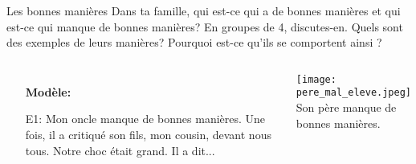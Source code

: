 \begin{frame}{Les bonnes manières}
  Dans ta famille, qui est-ce qui a de bonnes manières et qui est-ce qui manque de bonnes manières?
  En groupes de 4, discutes-en.
  Quels sont des exemples de leurs manières?
  Pourquoi est-ce qu'ils se comportent ainsi ?
  \begin{columns}
      \begin{itemize}
        \item[] \textbf{Modèle:}
        \item[E1:] \alert{Mon} oncle manque de bonnes manières. Une fois, il a critiqué \alert{son} fils, \alert{mon} cousin, devant nous tous. \alert{Notre} choc était grand. Il a dit...
      \end{itemize}
      \begin{center}
        \scriptsize
        \texttt{[image: pere\_mal\_eleve.jpeg]} \\
        Son père manque de bonnes manières.
      \end{center}
  \end{columns}
\end{frame}